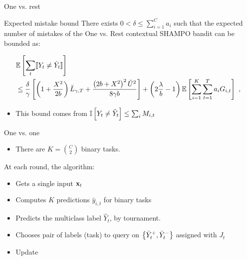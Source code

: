 \documentclass{beamer}
\begin{document}
\begin{frame}{One vs. rest}
\begin{block}{Expected mistake bound}
There exists $0<\delta\le \sum_{i=1}^Ca_{i}$ such that the  expected number of mistakes  of the One vs. Rest contextual SHAMPO bandit  can be bounded as:

 \[
 \begin{split}
 &\mathbb{E}\left[{\sum_t [\![{Y_t \neq \hat{Y}_t}]\!]}\right]\\
 &\le \frac{\delta}{\gamma}\left[{\left(1+\frac{X^2}{2b} \right){\bar L}_{\gamma,T}+
 \frac{\left({2b+X^2}\right)^2\tilde{U}^2}{8{\gamma}b}}\right]
 +\left({2\frac{\lambda}{b}-1}\right)\mathbb{E}\left[{\sum_{i=1}^{K}\sum_{t=1}^{T}{a_{i}G_{i,t}}}\right]~,
 \end{split}
 \]
\end{block}

\begin{itemize}
\item This bound comes from $\mathbb{I}\left[{Y_t \neq \hat{Y}_t}\right]\le \sum_iM_{i,t}$\newline

\end{itemize}
\end{frame}


\begin{frame}{One vs. one}
\begin{itemize}

\item There are $K= {C\choose2}$ binary tasks.\newline

\end{itemize}
At each round, the algorithm:\newline
\begin{itemize}
\item Gets a single input $\mathbf{x}_{t}$\newline
\item Computes $K$ predictions  $\hat{y}_{i,t}$ for binary tasks\newline
\item Predicts the multiclass label $\hat{Y}_t$, by tournament. \newline
\item Chooses pair of labels  (task) to  query on $\left\{{\bar{Y}_t^{+},\bar{Y}_t^{-}}\right\}$ assigned with $J_t$ \newline
\item Update
\end{itemize}
\end{frame}
\end{document}
